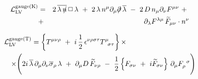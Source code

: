 \documentclass[a4paper,12pt]{article}
\newcommand{\slashed}[1]{\hbox{{$#1$}\llap{$/$}}}
\begin{document}
\begin{eqnarray}
\label{dim5_component}
	\mathcal{L}_{\mathrm{LV}}^{\mathrm{gauge(K)}} & = & 
	2\, \overline{\lambda\,\slashed{n}}\, \Box\, 
	   \lambda 
	~+~
	2\, \lambda\, n^\mu \partial_\mu \slashed{\partial}\, 
	   \overline{\lambda} 
	~-~ 
	2\, D\, n_\mu \partial_\nu F^{\mu\nu}
	~+~ \\
\nonumber
	& + &
	\partial_\lambda F^{\lambda\mu}\, 
	\widetilde{F}_{\mu\nu} \cdot n^\nu
\end{eqnarray}

\begin{eqnarray}
\nonumber
\lefteqn{
	\mathcal{L}_{\mathrm{LV}}^{\mathrm{gauge(T)}}  = 
	\left\{ T^{\mu\nu\rho} 
		~+~ 
	       i\,\frac{1}{2}\,\epsilon^{\nu\rho\sigma\tau}
	       T^\mu_{\phantom{\mu}\sigma\tau} \right\} \times 
	}\\
\nonumber
	&&
	\times
	\Biggl(
	     2i\, \overline{\lambda}\, \partial_\mu\partial_\nu
	     \overline{\sigma}_\rho\, \lambda 
		~+~
		\partial_\mu D\, \widetilde{F}_{\nu\rho}
		~-~
		\frac{1}{2}
		\left\{
			F_{\sigma\nu} ~+~ 
			i \widetilde{F}_{\sigma\nu}
		\right\}\, 
		\partial_\mu F_\rho^{\phantom{\rho}\sigma}
	\Biggr)
\end{eqnarray}
\end{document}
